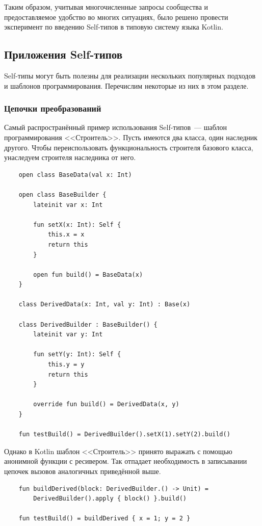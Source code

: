 Таким образом, учитывая многочисленные запросы сообщества и предоставляемое удобство во многих ситуациях, было решено провести эксперимент по введению Self-типов в типовую систему языка Kotlin.


\subsection{Приложения Self-типов}\label{subsec:applications}

Self-типы могут быть полезны для реализации нескольких популярных подходов и шаблонов программирования.
Перечислим некоторые из них в этом разделе.

\subsubsection{Цепочки преобразований}

Самый распространённый пример использования Self-типов~--- шаблон программирования <<Строитель>>.
Пусть имеются два класса, один наследник другого.
Чтобы переиспользовать функциональность строителя базового класса, унаследуем строителя наследника от него.

\begin{verbatim}
    open class BaseData(val x: Int)

    open class BaseBuilder {
        lateinit var x: Int

        fun setX(x: Int): Self {
            this.x = x
            return this
        }

        open fun build() = BaseData(x)
    }

    class DerivedData(x: Int, val y: Int) : Base(x)

    class DerivedBuilder : BaseBuilder() {
        lateinit var y: Int

        fun setY(y: Int): Self {
            this.y = y
            return this
        }

        override fun build() = DerivedData(x, y)
    }

    fun testBuild() = DerivedBuilder().setX(1).setY(2).build()
\end{verbatim}

Однако в Kotlin шаблон <<Строитель>> принято выражать с помощью анонимной функции с ресивером.
Так отпадает необходимость в записывании цепочек вызовов аналогичных приведённой выше.

\begin{verbatim}
    fun buildDerived(block: DerivedBuilder.() -> Unit) =
        DerivedBuilder().apply { block() }.build()

    fun testBuild() = buildDerived { x = 1; y = 2 }
\end{verbatim}

